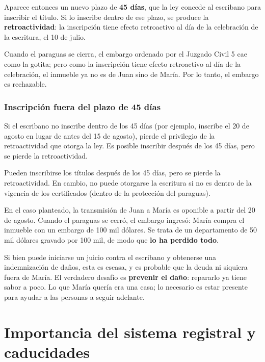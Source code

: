 \documentclass[12pt,oneside]{book}
\begin{document}
Aparece entonces un nuevo plazo de \textbf{45 días}, que la ley concede al escribano para inscribir el título. Si lo inscribe dentro de ese plazo, se produce la \textbf{retroactividad}: la inscripción tiene efecto retroactivo al día de la celebración de la escritura, el 10 de julio.

Cuando el paraguas se cierra, el embargo ordenado por el Juzgado Civil 5 cae como la gotita; pero como la inscripción tiene efecto retroactivo al día de la celebración, el inmueble ya no es de Juan sino de María. Por lo tanto, el embargo es rechazable.

\subsection{Inscripción fuera del plazo de 45 días}

Si el escribano no inscribe dentro de los 45 días (por ejemplo, inscribe el 20 de agosto en lugar de antes del 15 de agosto), pierde el privilegio de la retroactividad que otorga la ley. Es posible inscribir después de los 45 días, pero se pierde la retroactividad.

\begin{important}
Pueden inscribirse los títulos después de los 45 días, pero se pierde la retroactividad. En cambio, no puede otorgarse la escritura si no es dentro de la vigencia de los certificados (dentro de la protección del paraguas).
\end{important}

En el caso planteado, la transmisión de Juan a María es oponible a partir del 20 de agosto. Cuando el paraguas se cerró, el embargo ingresó: María compra el inmueble con un embargo de 100 mil dólares. Se trata de un departamento de 50 mil dólares gravado por 100 mil, de modo que \textbf{lo ha perdido todo}.

Si bien puede iniciarse un juicio contra el escribano y obtenerse una indemnización de daños, esta es escasa, y es probable que la deuda ni siquiera fuera de María. El verdadero desafío es \textbf{prevenir el daño}: repararlo ya tiene sabor a poco. Lo que María quería era una casa; lo necesario es estar presente para ayudar a las personas a seguir adelante.

\chapter{Importancia del sistema registral y caducidades}
\end{document}
